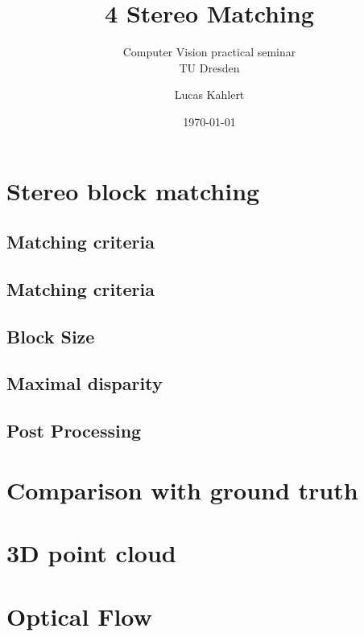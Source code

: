 \documentclass[a4paper]{scrartcl}
\title{4 Stereo Matching}
\subtitle{Computer Vision practical seminar \\ TU Dresden}
\author{Lucas Kahlert}
\date{\today}
\begin{document}
\maketitle

\section{Stereo block matching}

\subsection{Matching criteria}

\subsection{Matching criteria}

\subsection{Block Size}

\subsection{Maximal disparity}

\subsection{Post Processing}


\section{Comparison with ground truth}


\section{3D point cloud}


\section{Optical Flow}
\end{document}

